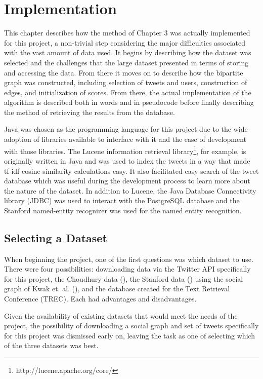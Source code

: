 

\chapter{Implementation}

This chapter describes how the method of Chapter 3 was actually implemented for this project, a non-trivial step considering the major difficulties associated with the vast amount of data used. It begins by describing how the dataset was selected and the challenges that the large dataset presented in terms of storing and accessing the data. From there it moves on to describe how the bipartite graph was constructed, including selection of tweets and users, construction of edges,  and initialization of scores. From there, the actual implementation of the algorithm is described both in words and in pseudocode before finally describing the method of retrieving the results from the database.

Java was chosen as the programming language for this project due to the wide adoption of libraries available to interface with it and the ease of development with those libraries. The Lucene information retrieval library\footnote{http://lucene.apache.org/core/}, for example, is originally written in Java and was used to index the tweets in a way that made tf-idf cosine-similarity calculations easy. It also facilitated easy search of the tweet database which was useful during the development process to learn more about the nature of the dataset. In addition to Lucene, the Java Database Connectivity library (JDBC) was used to interact with the PostgreSQL database and the Stanford named-entity recognizer was used for the named entity recognition.

\section{Selecting a Dataset}
\label{sec:SelectingADataset}

When beginning the project, one of the first questions was which dataset to use. There were four possibilities: downloading data via the Twitter API specifically for this project, the Choudhury data (\cite{Choudhury2010}), the Stanford data (\cite{Yang2011}) using the social graph of Kwak et. al. (\cite{Kwak2010}), and the database created for the Text Retrieval Conference (TREC). Each had advantages and disadvantages.

Given the availability of existing datasets that would meet the needs of the project, the possibility of downloading a social graph and set of tweets specifically for this project was dismissed early on, leaving the task as one of selecting which of the three datasets was best.

